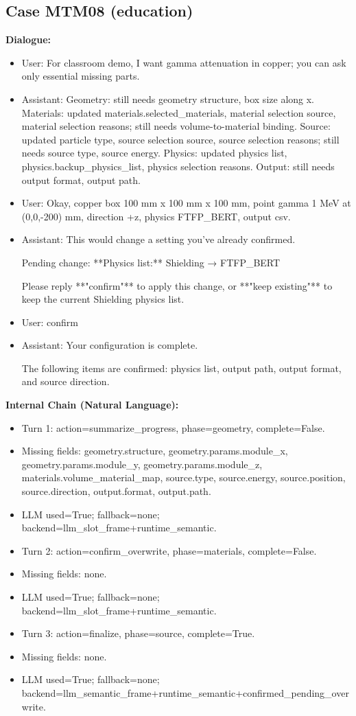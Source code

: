 \documentclass[11pt]{ctexart}
\begin{document}
\subsection{Case MTM08 (education)}
\textbf{Dialogue:}
\begin{itemize}
\item User: For classroom demo, I want gamma attenuation in copper; you can ask only essential missing parts.
\item Assistant: Geometry: still needs geometry structure, box size along x. Materials: updated materials.selected\_materials, material selection source, material selection reasons; still needs volume-to-material binding. Source: updated particle type, source selection source, source selection reasons; still needs source type, source energy. Physics: updated physics list, physics.backup\_physics\_list, physics selection reasons. Output: still needs output format, output path.
\item User: Okay, copper box 100 mm x 100 mm x 100 mm, point gamma 1 MeV at (0,0,-200) mm, direction +z, physics FTFP\_BERT, output csv.
\item Assistant: This would change a setting you've already confirmed.

Pending change:  
**Physics list:** Shielding → FTFP\_BERT

Please reply **"confirm"** to apply this change, or **"keep existing"** to keep the current Shielding physics list.
\item User: confirm
\item Assistant: Your configuration is complete.

The following items are confirmed: physics list, output path, output format, and source direction.
\end{itemize}
\textbf{Internal Chain (Natural Language):}
\begin{itemize}
\item Turn 1: action=summarize\_progress, phase=geometry, complete=False.
\item Missing fields: geometry.structure, geometry.params.module\_x, geometry.params.module\_y, geometry.params.module\_z, materials.volume\_material\_map, source.type, source.energy, source.position, source.direction, output.format, output.path.
\item LLM used=True; fallback=none; backend=llm\_slot\_frame+runtime\_semantic.
\item Turn 2: action=confirm\_overwrite, phase=materials, complete=False.
\item Missing fields: none.
\item LLM used=True; fallback=none; backend=llm\_slot\_frame+runtime\_semantic.
\item Turn 3: action=finalize, phase=source, complete=True.
\item Missing fields: none.
\item LLM used=True; fallback=none; backend=llm\_semantic\_frame+runtime\_semantic+confirmed\_pending\_overwrite.
\end{itemize}
\end{document}
